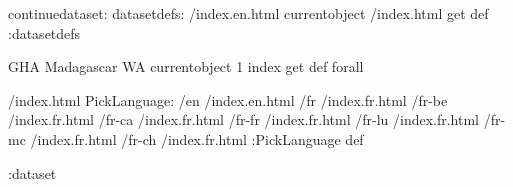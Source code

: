 \begin{ingrid}
continuedataset:
datasetdefs:
/index.en.html currentobject /index.html get def
:datasetdefs

{ GHA Madagascar WA } { currentobject 1 index get def } forall

/index.html {
PickLanguage:
/en /index.en.html
/fr /index.fr.html
/fr-be /index.fr.html
/fr-ca /index.fr.html
/fr-fr /index.fr.html
/fr-lu /index.fr.html
/fr-mc /index.fr.html
/fr-ch /index.fr.html
:PickLanguage
} def

:dataset
\end{ingrid}
